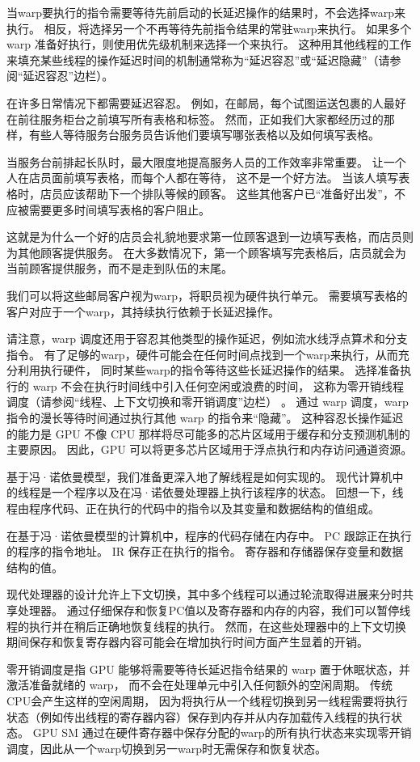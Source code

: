 当warp要执行的指令需要等待先前启动的长延迟操作的结果时，不会选择warp来执行。 
相反，将选择另一个不再等待先前指令结果的常驻warp来执行。 如果多个 warp 准备好执行，则使用优先级机制来选择一个来执行。 
这种用其他线程的工作来填充某些线程的操作延迟时间的机制通常称为“延迟容忍”或“延迟隐藏”（请参阅“延迟容忍”边栏）。

\begin{remark}[延迟容忍]
在许多日常情况下都需要延迟容忍。 例如，在邮局，每个试图运送包裹的人最好在前往服务柜台之前填写所有表格和标签。 
然而，正如我们大家都经历过的那样，有些人等待服务台服务员告诉他们要填写哪张表格以及如何填写表格。

当服务台前排起长队时，最大限度地提高服务人员的工作效率非常重要。 让一个人在店员面前填写表格，而每个人都在等待，
这不是一个好方法。 当该人填写表格时，店员应该帮助下一个排队等候的顾客。 
这些其他客户已“准备好出发”，不应被需要更多时间填写表格的客户阻止。

这就是为什么一个好的店员会礼貌地要求第一位顾客退到一边填写表格，而店员则为其他顾客提供服务。 
在大多数情况下，第一个顾客填写完表格后，店员就会为当前顾客提供服务，而不是走到队伍的末尾。

我们可以将这些邮局客户视为warp，将职员视为硬件执行单元。 
需要填写表格的客户对应于一个warp，其持续执行依赖于长延迟操作。
\end{remark}

请注意，warp 调度还用于容忍其他类型的操作延迟，例如流水线浮点算术和分支指令。 
有了足够的warp，硬件可能会在任何时间点找到一个warp来执行，从而充分利用执行硬件，
同时某些warp的指令等待这些长延迟操作的结果。 选择准备执行的 warp 不会在执行时间线中引入任何空闲或浪费的时间，
这称为零开销线程调度（请参阅“线程、上下文切换和零开销调度”边栏） 。 
通过 warp 调度，warp 指令的漫长等待时间通过执行其他 warp 的指令来“隐藏”。 
这种容忍长操作延迟的能力是 GPU 不像 CPU 那样将尽可能多的芯片区域用于缓存和分支预测机制的主要原因。 
因此，GPU 可以将更多芯片区域用于浮点执行和内存访问通道资源。

\begin{remark}[线程、上下文切换和零开销调度]
基于冯·诺依曼模型，我们准备更深入地了解线程是如何实现的。 
现代计算机中的线程是一个程序以及在冯·诺依曼处理器上执行该程序的状态。 
回想一下，线程由程序代码、正在执行的代码中的指令以及其变量和数据结构的值组成。

在基于冯·诺依曼模型的计算机中，程序的代码存储在内存中。 PC 跟踪正在执行的程序的指令地址。 
IR 保存正在执行的指令。 寄存器和存储器保存变量和数据结构的值。

现代处理器的设计允许上下文切换，其中多个线程可以通过轮流取得进展来分时共享处理器。 
通过仔细保存和恢复PC值以及寄存器和内存的内容，我们可以暂停线程的执行并在稍后正确地恢复线程的执行。 
然而，在这些处理器中的上下文切换期间保存和恢复寄存器内容可能会在增加执行时间方面产生显着的开销。

零开销调度是指 GPU 能够将需要等待长延迟指令结果的 warp 置于休眠状态，并激活准备就绪的 warp，
而不会在处理单元中引入任何额外的空闲周期。 传统CPU会产生这样的空闲周期，
因为将执行从一个线程切换到另一线程需要将执行状态（例如传出线程的寄存器内容）保存到内存并从内存加载传入线程的执行状态。 
GPU SM 通过在硬件寄存器中保存分配的warp的所有执行状态来实现零开销调度，因此从一个warp切换到另一warp时无需保存和恢复状态。
\end{remark}


